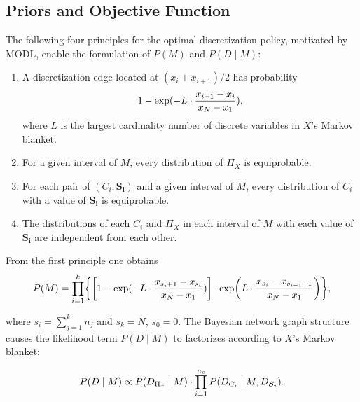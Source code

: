 

\subsection{Priors and Objective Function}

The following four principles for the optimal discretization policy, motivated by MODL, enable the formulation of $P(M)$ and $P(D \mid M)$:
\begin{enumerate}
\item A discretization edge located at $(x_i + x_{i+1})/2$ has probability
\begin{equation}
1 - {\exp(- L \cdot {{x_{i+1} - x_i}\over{x_N - x_1}})},
\end{equation}
where $L$ is the largest cardinality number of discrete variables in $X$'s Markov blanket. \mykel{$\bigstar$}
\item For a given interval of $M$, every distribution of $\Pi_X$ is equiprobable.
\item For each pair of $(C_i,\boldsymbol{S_i})$ and a given interval of $M$, every distribution of $C_i$ with a value of $\boldsymbol{S_i}$ is equiprobable.\mykel{$\bigstar$}
\item The distributions of each $C_i$ and $\Pi_X$ in each interval of $M$ with each value of $\boldsymbol{S_i}$ are independent from each other.\mykel{$\bigstar$}
\end{enumerate}

From the first principle one obtains
\begin{equation}
  \label{eq:p_M}
  P(M) = \prod_{i=1}^k \curly{ \brock{1 - {\exp(- L \cdot {{x_{s_i+1} - x_{s_i}}\over{x_N - x_1}})}} \cdot \exp\paren{L \cdot {{x_{s_{i}} - x_{s_{i-1} + 1}}\over{x_N - x_1}}}},
\end{equation}

\noindent
where $s_i = \sum_{j=1}^k n_j$ and $s_k = N$, $s_0 = 0$.
The Bayesian network graph structure causes the likelihood term $P(D \mid M)$ to factorizes according to $X$'s Markov blanket:

\begin{equation}
  \label{eq:p_D_given_M}
  P\paren{D \mid M} \propto P\paren{D_{\Pi_x} \mid M} \cdot \prod_{i = 1}^{n_c} P\paren{D_{C_i} \mid M, D_{\boldsymbol{S_i}}}\text{.}
\end{equation}

